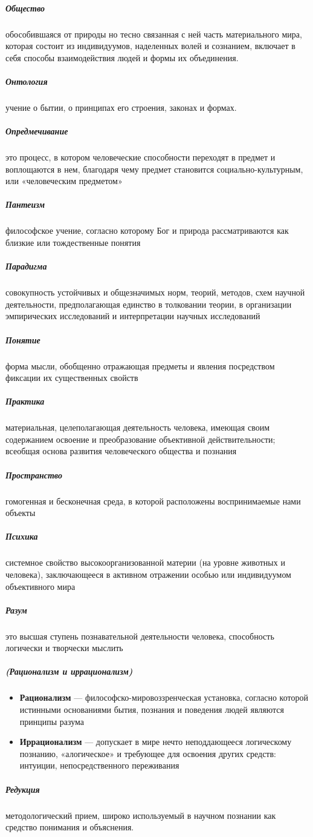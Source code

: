 \documentclass[a4paper, 12pt]{article}
\theoremstyle{plain} %
\theoremstyle{definition} %
\theoremstyle{remark} %
\begin{document}
\subparagraph{Общество}
	обособившаяся от природы но тесно связанная с ней часть материального мира, которая состоит из индивидуумов, наделенных волей и сознанием, включает в себя способы взаимодействия людей и формы их объединения.

\subparagraph{Онтология}
	учение о бытии, о принципах его строения, законах и формах.

\subparagraph{Опредмечивание}
	это процесс, в котором человеческие способности переходят в предмет и воплощаются в нем, благодаря чему предмет становится социально-культурным, или «человеческим предметом»

\subparagraph{Пантеизм}
	философское учение, согласно которому Бог и природа рассматриваются как близкие или тождественные понятия

\subparagraph{Парадигма}
	 совокупность устойчивых и общезначимых норм, теорий, методов, схем научной деятельности, предполагающая единство в толковании теории, в организации эмпирических исследований и интерпретации научных исследований

\subparagraph{Понятие}
	форма мысли, обобщенно отражающая предметы и явления посредством фиксации их существенных свойств

\subparagraph{Практика}
	материальная, целеполагающая деятельность человека, имеющая своим содержанием освоение и преобразование объективной действительности; всеобщая основа развития человеческого общества и познания

\subparagraph{Пространство}
	 гомогенная и бесконечная среда, в которой расположены воспринимаемые нами объекты

\subparagraph{Психика}
	системное свойство высокоорганизованной материи
	(на уровне животных и человека), заключающееся в активном отражении особью или индивидуумом объективного мира

\subparagraph{Разум}
	это высшая ступень познавательной деятельности человека, способность логически и творчески мыслить

\subparagraph{(Рационализм и иррационализм)}
\begin{itemize}
		\item[]\textbf{Рационализм} --- философско-мировоззренческая установка, согласно которой истинными основаниями бытия, познания и поведения людей являются принципы разума
		\item[]\textbf{Иррационализм} --- допускает в мире нечто неподдающееся логическому познанию, «алогическое» и требующее для освоения других средств: интуиции, непосредственного переживания
\end{itemize}
\subparagraph{Редукция}
	методологический прием, широко используемый в научном познании как средство понимания и объяснения.
\end{document}
